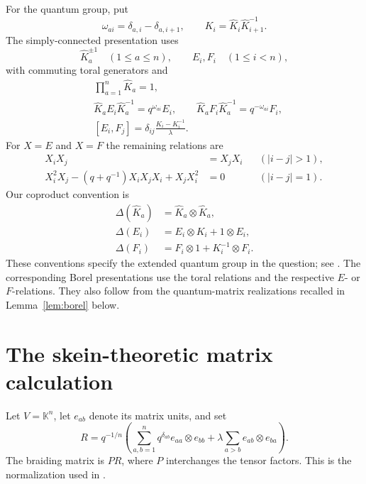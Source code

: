 \documentclass[11pt]{article}
\theoremstyle{remark}
\newcommand{\kk}{\mathbb{K}}
\begin{document}
For the quantum group, put
\[
 \omega_{ai}=\delta_{a,i}-\delta_{a,i+1},
 \qquad
 K_i=\widehat K_i\widehat K_{i+1}^{-1}.
\]
The simply-connected presentation uses
\[
 \widehat K_a^{\pm1}\quad(1\leq a\leq n),
 \qquad E_i,F_i\quad(1\leq i<n),
\]
with commuting toral generators and
\begin{align}
 &\prod_{a=1}^n\widehat K_a=1,
 \label{eq:torus-product}\\
 &\widehat K_a E_i\widehat K_a^{-1}=q^{\omega_{ai}}E_i,
 \qquad
 \widehat K_a F_i\widehat K_a^{-1}=q^{-\omega_{ai}}F_i,
 \label{eq:torus-weights}\\
 &[E_i,F_j]=\delta_{ij}\frac{K_i-K_i^{-1}}{\lambda}.
 \label{eq:DJ-comm}
\end{align}
For $X=E$ and $X=F$ the remaining relations are
\begin{align}
 X_iX_j&=X_jX_i &&(|i-j|>1),\label{eq:far}\\
 X_i^2X_j-(q+q^{-1})X_iX_jX_i+X_jX_i^2&=0
 &&(|i-j|=1).\label{eq:Serre}
\end{align}
Our coproduct convention is
\begin{equation}\label{eq:coproduct}
 \begin{split}
 \Delta(\widehat K_a)&=\widehat K_a\otimes\widehat K_a,\\
 \Delta(E_i)&=E_i\otimes K_i+1\otimes E_i,\\
 \Delta(F_i)&=F_i\otimes1+K_i^{-1}\otimes F_i.
 \end{split}
\end{equation}
These conventions specify the extended quantum group in the
question; see \cite{KS}.  The corresponding Borel presentations
use the toral relations and the respective $E$- or $F$-relations.
They also follow from the quantum-matrix realizations recalled in
Lemma~\ref{lem:borel} below.

\section{The skein-theoretic matrix calculation}

Let $V=\kk^n$, let $e_{ab}$ denote its matrix units, and set
\begin{equation}\label{eq:R}
 R=q^{-1/n}\left(
       \sum_{a,b=1}^n q^{\delta_{ab}}e_{aa}\otimes e_{bb}
       +\lambda\sum_{a>b}e_{ab}\otimes e_{ba}
     \right).
\end{equation}
The braiding matrix is $PR$, where $P$ interchanges the tensor
factors.  This is the normalization used in
\cite[Equation~(9)]{LS}.
\end{document}
